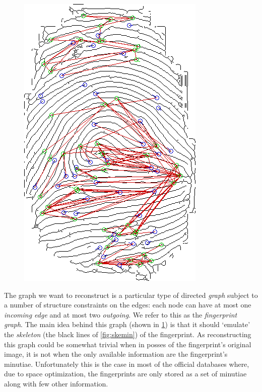 \documentclass[8pt]{article}
\begin{document}
\begin{figure}
\begin{minipage}{.5\textwidth}
  \includegraphics[width=.75\linewidth]{img/skemingraph}
  \label{fig:skemingraph}
\end{minipage}
\end{figure}

The graph we want to reconstruct is a particular type of directed
\textit{graph} subject to a number of structure constraints on the edges: each
node can have at most one \textit{incoming edge} and at most two
\textit{outgoing}.  We refer to this as the \emph{fingerprint graph}.  The main
idea behind this graph (shown in \cref{fig:skemingraph}) is that it should
\textquoteleft emulate' the \textit{skeleton} (the black lines of
\cref{fig:skemin}) of the fingerprint.  As reconstructing this graph could be
somewhat trivial when in posses of the fingerprint's original image, it is not
when the only available information are the fingerprint's minutiae.
Unfortunately this is the case in most of the official databases where, due to
space optimization, the fingerprints are only stored as a set of minutiae along
with few other information.
    
\end{document}

